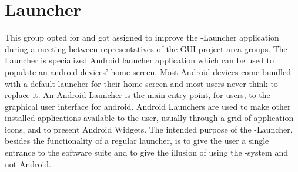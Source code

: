 
\section{Launcher}

This group opted for and got assigned to improve the \giraf-Launcher application during a meeting between representatives of the GUI project area groups.
The \giraf-Launcher is specialized Android launcher application which can be used to populate an android devices' home screen. Most Android devices come bundled with a default launcher for their home screen and most users never think to replace it. An Android Launcher is the main entry point, for users, to the graphical user interface for android. Android Launchers are used to make other installed applications available to the user, usually through a grid of application icons, and to present Android Widgets. The intended purpose of the \giraf-Launcher, besides the functionality of a regular launcher, is to give the user a single entrance to the \giraf software suite and to give the illusion of using the \giraf-system and not Android. 

